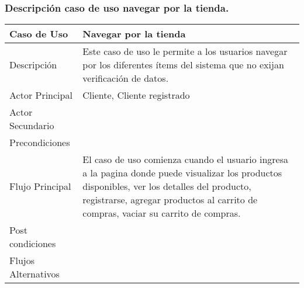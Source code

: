 \documentclass[12pt,a4paper]{article}
\begin{document}
    \newpage
\subsubsection*{Descripción caso de uso navegar por la tienda.}
\begin{table}[h]
        \centering
        \begin{tabular}{| p{3cm}| p{11cm} |} 
        \hline  
        Caso de Uso         &    \textbf{ Navegar por la tienda}   \\ 
        \hline
        Descripción         &    Este caso de uso le permite a los usuarios navegar por los diferentes ítems del sistema que no exijan verificación de datos.   \\ 
        \hline
        Actor Principal     &   Cliente, Cliente registrado   \\ 
        \hline
        Actor Secundario    &       \\ 
        \hline
        Precondiciones      &     	\\
        \hline
        Flujo Principal     &  El caso de uso comienza cuando el usuario ingresa a la pagina donde puede visualizar los productos disponibles, ver los detalles del producto, registrarse, agregar productos al carrito de compras, vaciar su carrito de compras.      \\  
        \hline
        Post condiciones    &       \\  
        \hline
        Flujos Alternativos &       \\  
        \hline
        \end{tabular}
    \end{table}

    \newpage
\end{document}
